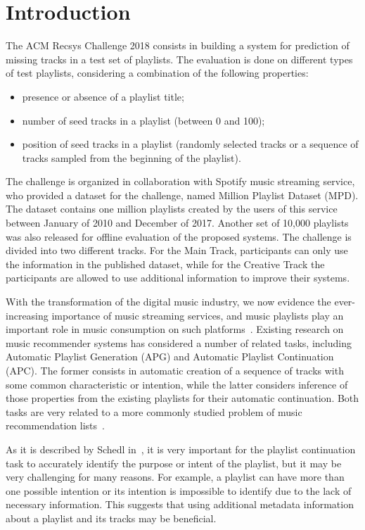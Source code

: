 \section{Introduction}

The ACM Recsys Challenge 2018 consists in building a system for prediction of missing tracks in a test set of playlists. The evaluation is done on different types of test playlists, considering a combination of the following properties:
\begin{itemize}
\item presence or absence of a playlist title;
\item number of seed tracks in a playlist (between 0 and 100);
\item position of seed tracks in a playlist (randomly selected tracks or a sequence of tracks sampled from the beginning of the playlist).
\end{itemize}
The challenge is organized in collaboration with Spotify music streaming service, who provided a dataset for the challenge, named Million Playlist Dataset (MPD). The dataset contains one million playlists created by the users of this service between January of 2010 and December of 2017. Another set of 10,000 playlists was also released for offline evaluation of the proposed systems.
The challenge is divided into two different tracks. For the Main Track, participants can only use the information in the published dataset, while for the Creative Track the participants are allowed to use additional information to improve their systems.

With the transformation of the digital music industry, we now evidence the ever-increasing importance of music streaming services, and music playlists play an important role in music consumption on such platforms~\cite{hogan_2010}. Existing research on music recommender systems has considered a number of related tasks, including Automatic Playlist Generation (APG) and Automatic Playlist Continuation (APC). The former consists in automatic creation of a sequence of tracks with some common characteristic or intention, while the latter considers inference of those properties from the existing playlists for their automatic continuation. Both tasks are very related to a more commonly studied problem of music recommendation lists~\cite{schedl2015music}.

As it is described by Schedl in~\cite{schedl2018current}, it is very important for the playlist continuation task to accurately identify the purpose or intent of the playlist, but it may be very challenging for many reasons. For example, a playlist can have more than one possible intention or its intention is impossible to identify due to the lack of necessary information. This suggests that using additional metadata information about a playlist and its tracks may be beneficial.

